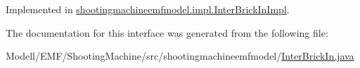 Implemented in \hyperlink{classshootingmachineemfmodel_1_1impl_1_1_inter_brick_in_impl_ab4e713043891d5e2f9b826e4becca101}{shootingmachineemfmodel.\-impl.\-Inter\-Brick\-In\-Impl}.



The documentation for this interface was generated from the following file\-:\begin{DoxyCompactItemize}
\item 
Modell/\-E\-M\-F/\-Shooting\-Machine/src/shootingmachineemfmodel/\hyperlink{_inter_brick_in_8java}{Inter\-Brick\-In.\-java}\end{DoxyCompactItemize}
